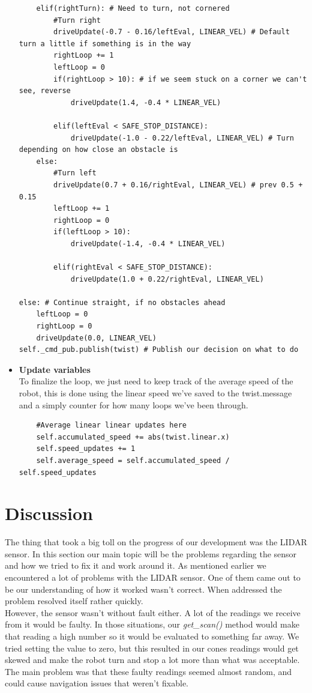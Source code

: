 \documentclass[conference]{IEEEtran}
\begin{document}
\begin{itemize}
\begin{lstlisting}
    elif(rightTurn): # Need to turn, not cornered
        #Turn right
        driveUpdate(-0.7 - 0.16/leftEval, LINEAR_VEL) # Default turn a little if something is in the way
        rightLoop += 1
        leftLoop = 0
        if(rightLoop > 10): # if we seem stuck on a corner we can't see, reverse
            driveUpdate(1.4, -0.4 * LINEAR_VEL)
        
        elif(leftEval < SAFE_STOP_DISTANCE):
            driveUpdate(-1.0 - 0.22/leftEval, LINEAR_VEL) # Turn depending on how close an obstacle is
    else:
        #Turn left 
        driveUpdate(0.7 + 0.16/rightEval, LINEAR_VEL) # prev 0.5 + 0.15
        leftLoop += 1
        rightLoop = 0
        if(leftLoop > 10):
            driveUpdate(-1.4, -0.4 * LINEAR_VEL)

        elif(rightEval < SAFE_STOP_DISTANCE):
            driveUpdate(1.0 + 0.22/rightEval, LINEAR_VEL)

else: # Continue straight, if no obstacles ahead
    leftLoop = 0
    rightLoop = 0
    driveUpdate(0.0, LINEAR_VEL)
self._cmd_pub.publish(twist) # Publish our decision on what to do
\end{lstlisting}
\item \textbf{Update variables}\\
To finalize the loop, we just need to keep track of the average speed of the robot, this is done using the linear speed we've
saved to the twist.message and a simply counter for how many loops we've been through.
\begin{lstlisting}
    #Average linear linear updates here
    self.accumulated_speed += abs(twist.linear.x)
    self.speed_updates += 1
    self.average_speed = self.accumulated_speed / self.speed_updates
\end{lstlisting}
\end{itemize}


\section{Discussion}\label{discussion}
The thing that took a big toll on the progress of our development was the LIDAR sensor. 
In this section our main topic will be the problems regarding the sensor and how we tried to fix it and work around it. 
As mentioned earlier we encountered a lot of problems with the LIDAR sensor. 
One of them came out to be our understanding of how it worked wasn't correct. When addressed the problem resolved itself 
rather quickly. \\
However, the sensor wasn't without fault either. A lot of the readings we receive from it would be faulty. 
In those situations, our \textit{get\_scan()} method would make that reading a high number so it would be evaluated to 
something far away. We tried setting the value to zero, but this resulted in our cones readings would get skewed and 
make the robot turn and stop a lot more than what was acceptable. The main problem was that these faulty readings seemed 
almost random, and could cause navigation issues that weren't fixable.
\end{document}

